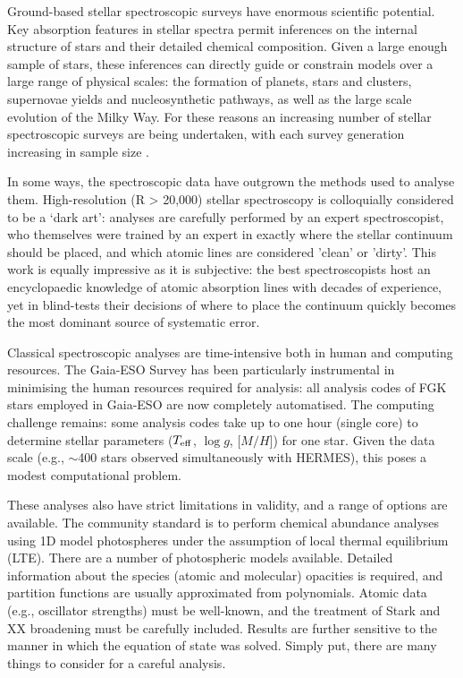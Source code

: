 \documentclass[useAMS,usenatbib]{mn2e}
\newcommand\teff{$T_{\rm eff}$}
\newcommand\logg{$\log{g}$}
\newcommand\mh{${\mathrm [M/H]}$}
\begin{document}
Ground-based stellar spectroscopic surveys have enormous scientific potential. Key absorption features in stellar spectra permit inferences on the internal structure of stars and their detailed chemical composition. Given a large enough sample of stars, these inferences can directly guide or constrain models over a large range of physical scales: the formation of planets, stars and clusters, supernovae yields and nucleosynthetic pathways, as well as the large scale evolution of the Milky Way. For these reasons an increasing number of stellar spectroscopic surveys are being undertaken, with each survey generation increasing in sample size \citep{gaia_eso; galah; lamost; apogee; 4most}.

In some ways, the spectroscopic data have outgrown the methods used to analyse them. High-resolution (R > 20,000) stellar spectroscopy is colloquially considered to be a `dark art': analyses are carefully performed by an expert spectroscopist, who themselves were trained by an expert in exactly where the stellar continuum should be placed, and which atomic lines are considered 'clean' or 'dirty'. This work is equally impressive as it is subjective: the best spectroscopists host an encyclopaedic knowledge of atomic absorption lines with decades of experience, yet in blind-tests their decisions of where to place the continuum quickly becomes the most dominant source of systematic error.

Classical spectroscopic analyses are time-intensive both in human and computing resources. The Gaia-ESO Survey has been particularly instrumental in minimising the human resources required for analysis: all analysis codes of FGK stars employed in Gaia-ESO are now completely automatised. The computing challenge remains: some analysis codes take up to one hour (single core) to determine stellar parameters (\teff, \logg, \mh) for one star. Given the data scale (e.g., $\sim$400 stars observed simultaneously with HERMES), this poses a modest computational problem.

These analyses also have strict limitations in validity, and a range of options are available. The community standard is to perform chemical abundance analyses using 1D model photospheres under the assumption of local thermal equilibrium (LTE). There are a number of photospheric models available. Detailed information about the species (atomic and molecular) opacities is required, and partition functions are usually approximated from polynomials. Atomic data (e.g., oscillator strengths) must be well-known, and the treatment of Stark and XX broadening must be carefully included. Results are further sensitive to the manner in which the equation of state was solved. Simply put, there are many things to consider for a careful analysis.
\end{document}
